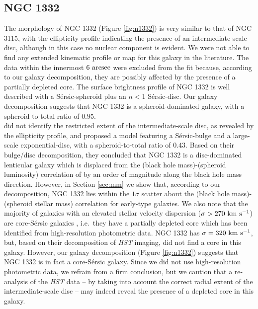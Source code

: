 \documentclass[useAMS,usenatbib,article]{mnras}
\begin{document}
\subsection{NGC 1332}
The morphology of NGC 1332 (Figure \ref{fig:n1332}) is very similar to that of NGC 3115, 
with the ellipticity profile indicating the presence of an intermediate-scale disc, 
although in this case no nuclear component is evident. 
We were not able to find any extended kinematic profile or map 
for this galaxy in the literature. 
The data within the innermost $6~\rm arcsec$ were excluded from the fit 
because, according to our galaxy decomposition, they are possibly affected by the presence of a partially depleted core.
The surface brightness profile of NGC 1332 is well described with a S\'ersic-spheroid plus
an $n<1$ S\'ersic-disc. 
Our galaxy decomposition suggests that NGC 1332 is a spheroid-dominated galaxy, 
with a spheroid-to-total ratio of $0.95$. \\
\cite{rusli2011} did not identify the restricted extent of the intermediate-scale disc, 
as revealed by the ellipticity profile, 
and proposed a model featuring a S\'ersic-bulge and a large-scale exponential-disc, 
with a spheroid-to-total ratio of $0.43$.
Based on their bulge/disc decomposition, they concluded that NGC 1332 is a disc-dominated lenticular galaxy 
which is displaced from the (black hole mass)-(spheroid luminosity) correlation of \cite{marconihunt2003} 
by an order of magnitude along the black hole mass direction. 
However, in Section \ref{sec:mm} we show that, according to our decomposition, 
NGC 1332 lies within the $1\sigma$ scatter about the (black hole mass)-(spheroid stellar mass) correlation 
for early-type galaxies. 
We also note that the majority of galaxies with an elevated stellar velocity dispersion ($\sigma > 270~\rm km~s^{-1}$) 
are core-S\'ersic galaxies \citep{graham2003coresersicmodel,ferrarese2006acsvcs,dullograham2014cores}, 
i.e.~they have a partially depleted core which has been identified from high-resolution photometric data. 
NGC 1332 has $\sigma = 320~\rm km~s^{-1}$, but, 
based on their decomposition of \emph{HST} imaging, \cite{rusli2011} did not find a core in this galaxy. 
However, our galaxy decomposition (Figure \ref{fig:n1332}) suggests that NGC 1332 is in fact a core-S\'ersic galaxy. 
Since we did not use high-resolution photometric data, 
we refrain from a firm conclusion, 
but we caution that a re-analysis of the \emph{HST} data -- by taking into account the correct radial extent of the intermediate-scale disc --
may indeed reveal the presence of a depleted core in this galaxy.
\end{document}
